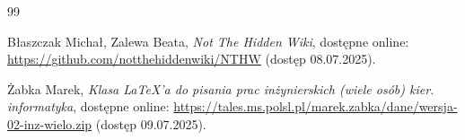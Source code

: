 \begin{thebibliography}{99}

Błaszczak Michał, Zalewa Beata, \textit{Not The Hidden Wiki}, dostępne online: \url{https://github.com/notthehiddenwiki/NTHW} (dostęp 08.07.2025).

Żabka Marek, \textit{Klasa LaTeX'a do pisania prac inżynierskich (wiele osób) kier. informatyka}, dostępne online: \url{https://tales.ms.polsl.pl/marek.zabka/dane/wersja-02-inz-wielo.zip} (dostęp 09.07.2025).

\end{thebibliography}
